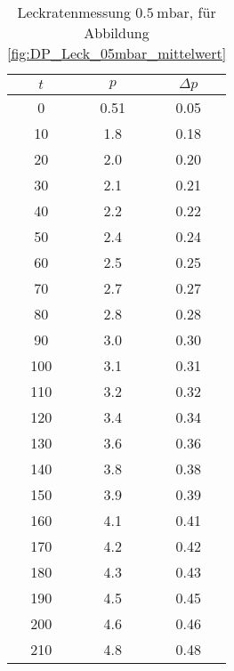 \begin{table}[H]
    \centering
    \caption{Leckratenmessung $\SI{0.5}{\milli\bar}$, für Abbildung \ref{fig:DP_Leck_05mbar_mittelwert}}
    \label{tab:}
    \begin{tabular}{c c c}
        \toprule
        {$t$} & {$p$} & {$\Delta p$} \\
        \midrule
        0 & 0.51 & 0.05\\
        10 & 1.8 & 0.18\\
        20 & 2.0 & 0.20\\
        30 & 2.1 & 0.21\\
        40 & 2.2 & 0.22\\
        50 & 2.4 & 0.24\\
        60 & 2.5 & 0.25\\
        70 & 2.7 & 0.27\\
        80 & 2.8 & 0.28\\
        90 & 3.0 & 0.30\\
        100 & 3.1 & 0.31\\
        110 & 3.2 & 0.32\\
        120 & 3.4 & 0.34\\
        130 & 3.6 & 0.36\\
        140 & 3.8 & 0.38\\
        150 & 3.9 & 0.39\\
        160 & 4.1 & 0.41\\
        170 & 4.2 & 0.42\\
        180 & 4.3 & 0.43\\
        190 & 4.5 & 0.45\\
        200 & 4.6 & 0.46\\
        210 & 4.8 & 0.48\\
        \bottomrule
    \end{tabular}
\end{table}

